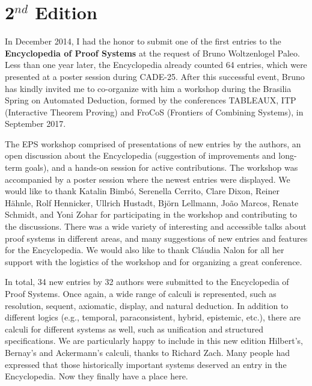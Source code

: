 \preface
\vspace{-150pt}
\section*{2$^{nd}$ Edition}
\vspace{130pt}

In December 2014, I had the honor to submit one of the first entries to the
\textbf{Encyclopedia of Proof Systems} at the request of Bruno Woltzenlogel
Paleo.
%
Less than one year later, the Encyclopedia already counted 64 entries, which
were presented at a poster session during CADE-25.
%
After this successful event, Bruno has kindly invited me to co-organize with him
a workshop during the Brasilia Spring on Automated Deduction, formed by the
conferences TABLEAUX, ITP (Interactive Theorem Proving) and FroCoS (Frontiers of
Combining Systems), in September 2017.

The EPS workshop comprised of presentations of new entries by the authors, an
open discussion about the Encyclopedia (suggestion of improvements and long-term
goals), and a hands-on session for active contributions.
%
The workshop was accompanied by a poster session where the newest entries were
displayed.
%
We would like to thank
Katalin Bimb\'{o},
Serenella Cerrito,
Clare Dixon,
Reiner H\"{a}hnle,
Rolf Hennicker,
Ullrich Hustadt,
Bj\"{o}rn Lellmann,
Jo\~{a}o Marcos,
Renate Schmidt, and
Yoni Zohar
for participating in the workshop and contributing to the discussions.
%
There was a wide variety of interesting and accessible talks about proof systems
in different areas, and many suggestions of new entries and features for
the Encyclopedia.
%
We would also like to thank Cl\'{a}udia Nalon for all her support with the
logistics of the workshop and for organizing a great conference.

In total, 34 new entries by 32 authors were submitted to the Encyclopedia of
Proof Systems.
%
Once again, a wide range of calculi is represented, such as resolution, sequent,
axiomatic, display, and natural deduction.
%
In addition to different logics (e.g., temporal, paraconsistent, hybrid,
epistemic, etc.), there are calculi for different systems as well, such as
unification and structured specifications.
%
We are particularly happy to include in this new edition Hilbert's, Bernay's and
Ackermann's calculi, thanks to Richard Zach.
%
Many people had expressed that those historically important systems deserved an
entry in the Encyclopedia. Now they finally have a place here.

